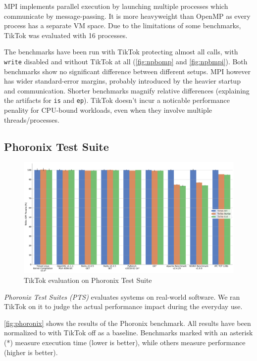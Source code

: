\documentclass[conference]{IEEEtran}
\newcommand{\sysname}{TikTok}
\begin{document}
MPI implements parallel execution by launching multiple processes which communicate
by message-passing. It is more heavyweight than OpenMP as every process has a
separate VM space. Due to the limitations of some benchmarks, \sysname{} was 
evaluated with 16 processes.

The benchmarks have been run with \sysname{} protecting almost all calls, with
\texttt{write} disabled and without \sysname{} at all (\autoref{fig:npbomp} and
\autoref{fig:npbmpi}). Both benchmarks show no significant difference between
different setups. MPI however has wider standard-error margins, probably
introduced by the heavier startup and communication. Shorter benchmarks magnify
relative differences (explaining the artifacts for \texttt{is} and \texttt{ep}).
\sysname{} doesn't incur a noticable performance
penality for CPU-bound workloads, even when they involve multiple
threads/processes.

\subsection{Phoronix Test Suite}
\label{subsec:phoronix}

\begin{figure}[]
  \centering
  \includegraphics[width=\linewidth]{graphs/phoronix.png}
  \caption{\sysname{} evaluation on Phoronix Test Suite}
  \label{fig:phoronix}
\end{figure}

\emph{Phoronix Test Suites (PTS)} evaluates systems on real-world software. We
ran \sysname{} on it to judge the actual performance impact during the
everyday use.

\autoref{fig:phoronix} shows the results of the Phoronix benchmark. All
results have been normalized to with \sysname{} off as a baseline. Benchmarks
marked with an asterisk (*) measure execution time (lower is better), while others
measure performance (higher is better).
\end{document}
